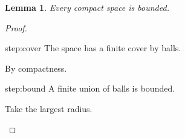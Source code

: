 \documentclass{article}
\newtheorem{lemma}{Lemma}
\begin{document}
\begin{lemma}
Every compact space is bounded.
\end{lemma}
\begin{proof}
  \begin{step+}{step:cover}
    The space has a finite cover by balls.
  \end{step+}
  \begin{prooof}
    By compactness.
  \end{prooof}
  \begin{step+}{step:bound}
    A finite union of balls is bounded.
  \end{step+}
  \begin{prooof}
    Take the largest radius.
  \end{prooof}
\end{proof}
\end{document}
